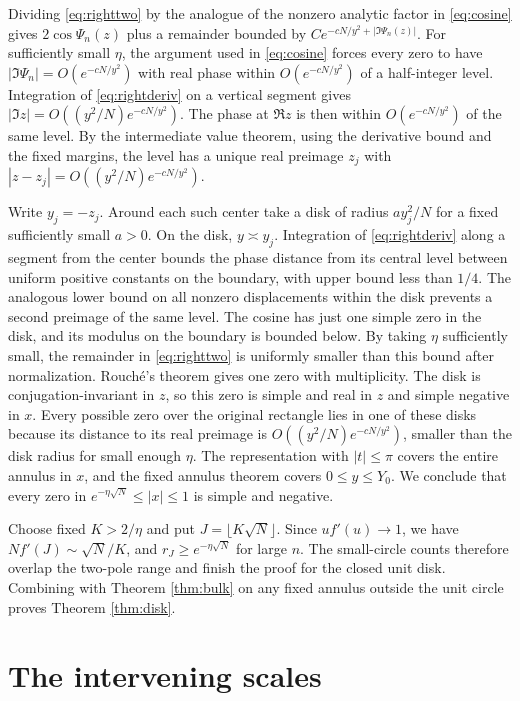 \documentclass[11pt]{article}
\begin{document}
Dividing \eqref{eq:righttwo} by the analogue of the nonzero analytic factor in \eqref{eq:cosine} gives \(2\cos\Psi_n(z)\) plus a remainder bounded by \(C e^{-cN/y^2+|\Im\Psi_n(z)|}\). For sufficiently small \(\eta\), the argument used in \eqref{eq:cosine} forces every zero to have \(|\Im\Psi_n|=O(e^{-cN/y^2})\) with real phase within \(O(e^{-cN/y^2})\) of a half-integer level. Integration of \eqref{eq:rightderiv} on a vertical segment gives \(|\Im z|=O((y^2/N)e^{-cN/y^2})\). The phase at \(\Re z\) is then within \(O(e^{-cN/y^2})\) of the same level. By the intermediate value theorem, using the derivative bound and the fixed margins, the level has a unique real preimage \(z_j\) with \(|z-z_j|=O((y^2/N)e^{-cN/y^2})\).

Write \(y_j=-z_j\). Around each such center take a disk of radius \(a y_j^2/N\) for a fixed sufficiently small \(a>0\). On the disk, \(y\asymp y_j\). Integration of \eqref{eq:rightderiv} along a segment from the center bounds the phase distance from its central level between uniform positive constants on the boundary, with upper bound less than \(1/4\). The analogous lower bound on all nonzero displacements within the disk prevents a second preimage of the same level. The cosine has just one simple zero in the disk, and its modulus on the boundary is bounded below. By taking \(\eta\) sufficiently small, the remainder in \eqref{eq:righttwo} is uniformly smaller than this bound after normalization. Rouch\'e's theorem gives one zero with multiplicity. The disk is conjugation-invariant in \(z\), so this zero is simple and real in \(z\) and simple negative in \(x\). Every possible zero over the original rectangle lies in one of these disks because its distance to its real preimage is \(O((y^2/N)e^{-cN/y^2})\), smaller than the disk radius for small enough \(\eta\). The representation with \(|t|\le\pi\) covers the entire annulus in \(x\), and the fixed annulus theorem covers \(0\le y\le Y_0\). We conclude that every zero in \(e^{-\eta\sqrt N}\le |x|\le1\) is simple and negative.

Choose fixed \(K>2/\eta\) and put \(J=\lfloor K\sqrt N\rfloor\). Since \(u f'(u)\to1\), we have \(Nf'(J)\sim \sqrt N/K\), and \(r_J\ge e^{-\eta\sqrt N}\) for large \(n\). The small-circle counts therefore overlap the two-pole range and finish the proof for the closed unit disk. Combining with Theorem \ref{thm:bulk} on any fixed annulus outside the unit circle proves Theorem \ref{thm:disk}.

\section{The intervening scales}
\end{document}
